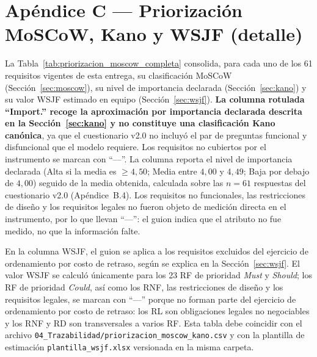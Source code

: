 \documentclass[journal,onecolumn]{IEEEtran}
\begin{document}
	\newpage
	\section*{Apéndice C --- Priorización MoSCoW, Kano y WSJF (detalle)}
	\label{ap:priorizacion}
	
	La Tabla~\ref{tab:priorizacion_moscow_completa} consolida, para cada uno de
	los 61 requisitos vigentes de esta entrega, su clasificación MoSCoW
	(Sección~\ref{sec:moscow}), su nivel de importancia declarada
	(Sección~\ref{sec:kano}) y su valor WSJF estimado en equipo
	(Sección~\ref{sec:wsjf}). \textbf{La columna rotulada \enquote{Import.}
		recoge la aproximación por importancia declarada descrita en la
		Sección~\ref{sec:kano} y no constituye una clasificación Kano canónica},
	ya que el cuestionario v2.0 no incluyó el par de preguntas funcional y
	disfuncional que el modelo requiere. Los requisitos no cubiertos por el
	instrumento se marcan con \enquote{---}. La columna reporta el nivel de
	importancia declarada (Alta si la media es $\geq 4{,}50$; Media entre
	$4{,}00$ y $4{,}49$; Baja por debajo de $4{,}00$) seguido de la media
	obtenida, calculada sobre las $n = 61$ respuestas del cuestionario v2.0
	(Apéndice~B.4). Los requisitos no funcionales, las restricciones de diseño y
	los requisitos legales no fueron objeto de medición directa en el
	instrumento, por lo que llevan \enquote{---}: el guion indica que el atributo
	no fue medido, no que la información falte.
	
	En la columna WSJF, el guion se aplica a los requisitos excluidos del
	ejercicio de ordenamiento por costo de retraso, según se explica en la
	Sección~\ref{sec:wsjf}. El valor WSJF se calculó únicamente para los 23 RF
	de prioridad \emph{Must} y \emph{Should}; los RF de prioridad \emph{Could},
	así como los RNF, las restricciones de diseño y los requisitos legales, se
	marcan con \enquote{---} porque no forman parte del ejercicio de ordenamiento
	por costo de retraso: los RL son obligaciones legales no negociables y los
	RNF y RD son transversales a varios RF. Esta tabla debe coincidir con el
	archivo \texttt{04\_Trazabilidad/priorizacion\_moscow\_kano.csv} y con la
	plantilla de estimación \texttt{plantilla\_wsjf.xlsx} versionada en la misma
	carpeta.
	
\end{document}
